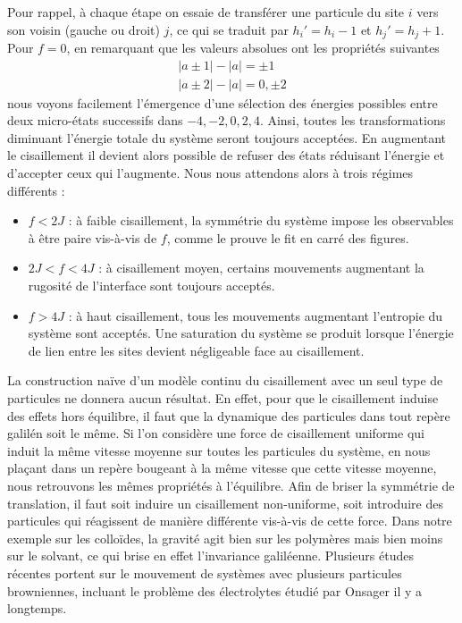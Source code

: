Pour rappel, à chaque étape on essaie de transférer une particule du site $i$ vers son voisin (gauche ou droit) $j$, ce qui se traduit par $h_i' = h_i-1$ et $h_j' = h_j+1$. 
Pour $f=0$, en remarquant que les valeurs absolues ont les propriétés suivantes
\begin{align}
	|a \pm 1| - |a| = \pm 1 \\
	|a \pm 2| - |a| = {0,\pm 2}
\end{align}
nous voyons facilement l'émergence d'une sélection des énergies possibles entre deux micro-états successifs dans ${-4,-2,0,2,4}$. Ainsi, toutes les transformations diminuant l'énergie totale du système seront toujours acceptées. En augmentant le cisaillement il devient alors possible de refuser des états réduisant l'énergie et d'accepter ceux qui l'augmente. 
Nous nous attendons alors à trois régimes différents :
\begin{itemize}
	\item $f  \less  2 J $ : à faible cisaillement, la symmétrie du système impose les observables à être paire vis-à-vis de $f$, comme le prouve le fit en carré des figures.
	\item $2 J \less f \less 4 J$ : à cisaillement moyen, certains mouvements augmentant la rugosité de l'interface sont toujours acceptés. 
	\item $f > 4 J$ : à haut cisaillement, tous les mouvements augmentant l'entropie du système sont acceptés. Une saturation du système se produit lorsque l'énergie de lien entre les sites devient négligeable face au cisaillement.
\end{itemize}


La construction naïve d'un modèle continu du cisaillement avec un seul type de particules ne donnera aucun résultat. En effet, pour que le cisaillement induise des effets hors équilibre, il faut que la dynamique des particules dans tout repère galilén soit le même. Si l'on considère une force de cisaillement uniforme qui induit la même vitesse moyenne sur toutes les particules du système, en nous plaçant dans un repère bougeant à la même vitesse que cette vitesse moyenne, nous retrouvons les mêmes propriétés à l'équilibre.
Afin de briser la symmétrie de translation, il faut soit induire un cisaillement non-uniforme, soit introduire des particules qui réagissent de manière différente vis-à-vis de cette force. Dans notre exemple sur les colloïdes, la gravité agit bien sur les polymères mais bien moins sur le solvant, ce qui brise en effet l'invariance galiléenne. 
Plusieurs études récentes portent sur le mouvement de systèmes avec plusieurs particules browniennes, incluant le problème des électrolytes étudié par Onsager \cite{onsager} il y a longtemps.

